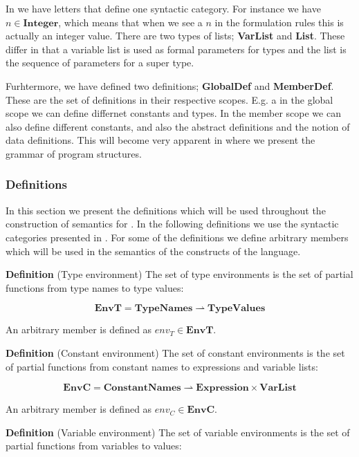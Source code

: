In  we have letters that define one syntactic
category. For instance we have $n \in \mathbf{Integer}$, which means that when
we see a $n$ in the formulation rules this is actually an integer value. There
are two types of lists; \textbf{VarList} and \textbf{List}. These differ in that
a variable list is used as formal parameters for types and the list is the
sequence of parameters for a super type. 

Furhtermore, we have defined two definitions; \textbf{GlobalDef} and
\textbf{MemberDef}. These are the set of definitions in their respective scopes.
E.g. a in the global scope we can define differnet constants and types. In the
member scope we can also define different constants, and also the abstract
definitions and the notion of data definitions. This will become very apparent
in  where we present the grammar of program structures.

\subsubsection{Definitions}
\label{sec:abstractdefinitions}

In this section we present the definitions which will be used throughout the
construction of semantics for \productname{}. In the following definitions we
use the syntactic categories presented in . For some of
the definitions we define arbitrary members which will be used in the semantics
of the constructs of the language.

\textbf{Definition} (Type environment) \hspace{0.5cm} The set of type environments is the set of
partial functions from type names to type values:

\[
  \mathbf{EnvT} = \mathbf{TypeNames} \rightharpoonup \mathbf{TypeValues}
\]

An arbitrary member is defined as $env_{T} \in \mathbf{EnvT}$.


\textbf{Definition} (Constant environment) \hspace{0.5cm} The set of constant environments is the set
of partial functions from constant names to expressions and variable lists:

\[
  \mathbf{EnvC} = \mathbf{ConstantNames} \rightharpoonup \mathbf{Expression}
  \times \mathbf{VarList}
\]

An arbitrary member is defined as $env_{C} \in \mathbf{EnvC}$.

\textbf{Definition} (Variable environment) \hspace{0.5cm} The set of variable environments is the set
of partial functions from variables to values:

